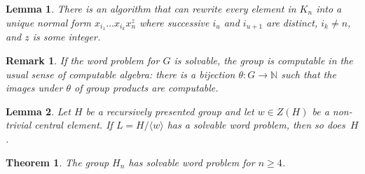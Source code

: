 \documentclass[10pt,a4paper]{amsart}
\newtheorem{lemma}{Lemma}
\newtheorem{remark}{Remark}
\newtheorem{theorem}{Theorem}
\renewcommand{\geq}{\geqslant}
\newcommand{\la}{\langle}
\newcommand{\ra}{\rangle}
\begin{document}
\begin{lemma} \label{lem Kn}
There is an algorithm that can rewrite  every element in $K_n$ into a unique normal form  $x_{i_1}\ldots x_{i_k}x_n^z$ where successive $i_u$ and $i_{u+1}$ are distinct, $i_k\ne n$, and $z$ is some integer. 
\end{lemma}

\begin{remark} \label{Malcev} If the word problem for $G$ is solvable, the group is computable in the usual sense of computable algebra: there is a bijection  $\theta \colon G \to \mathbb N$ such that the images under $\theta$ of group products are computable. 
 \end{remark}

\begin{lemma} \label{lem: rec presented} Let $H$ be a recursively presented group and let   $w\in Z(H)$  be a non-trivial central element. If $L= H/\la w \ra$ has a solvable word problem, then so does~$H$.
\end{lemma}

  \begin{theorem}\label{Hn_solv_wp} The group $H_n$ has solvable word problem for $n\geq 4$. \end{theorem}
\end{document}
